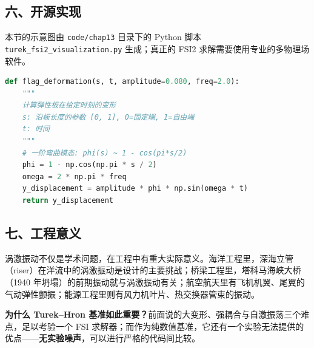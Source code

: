 \subsection*{六、开源实现}


本节的示意图由 \texttt{code/chap13} 目录下的 Python 脚本 \texttt{turek\_fsi2\_\allowbreak visualization.py} 生成；真正的 FSI2 求解需要使用专业的多物理场软件。

\begin{lstlisting}[language=Python, caption=弹性板变形计算示意]
def flag_deformation(s, t, amplitude=0.080, freq=2.0):
    """
    计算弹性板在给定时刻的变形
    s: 沿板长度的参数 [0, 1], 0=固定端, 1=自由端
    t: 时间
    """
    # 一阶弯曲模态: phi(s) ~ 1 - cos(pi*s/2)
    phi = 1 - np.cos(np.pi * s / 2)
    omega = 2 * np.pi * freq
    y_displacement = amplitude * phi * np.sin(omega * t)
    return y_displacement
\end{lstlisting}

\subsection*{七、工程意义}

涡激振动不仅是学术问题，在工程中有重大实际意义。海洋工程里，深海立管（riser）在洋流中的涡激振动是设计的主要挑战；桥梁工程里，塔科马海峡大桥（1940 年坍塌）的前期振动就与涡激振动有关；航空航天里有飞机机翼、尾翼的气动弹性颤振；能源工程里则有风力机叶片、热交换器管束的振动。


\begin{insightbox}
\textbf{为什么 Turek--Hron 基准如此重要？}前面说的大变形、强耦合与自激振荡三个难点，足以考验一个 FSI 求解器；而作为纯数值基准，它还有一个实验无法提供的优点——\textbf{无实验噪声}，可以进行严格的代码间比较。
\end{insightbox}


